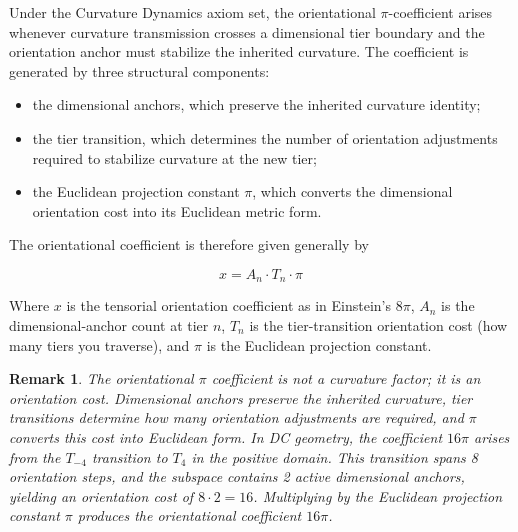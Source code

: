 \documentclass[final,onefignum,onetabnum]{siamart}
\newtheorem{remark}{Remark}
\begin{document}
\begin{theorem}
Under the Curvature Dynamics axiom set, the orientational $\pi$-coefficient arises whenever curvature transmission crosses a dimensional tier boundary and the orientation anchor must stabilize the inherited curvature. The coefficient is generated by three structural components:

\begin{itemize}
    \item the dimensional anchors, which preserve the inherited curvature identity;
    \item the tier transition, which determines the number of orientation adjustments required to stabilize curvature at the new tier;
    \item the Euclidean projection constant $\pi$, which converts the dimensional orientation cost into its Euclidean metric form.
\end{itemize}

The orientational coefficient is therefore given generally by


\[
x = A_n \cdot T_n \cdot \pi
\]


Where $x$ is the tensorial orientation coefficient as in Einstein’s $8\pi$, $A_n$ is the dimensional-anchor count at tier 
$n$, $T_n$ is the tier-transition orientation cost (how many tiers you traverse), and $\pi$ is the Euclidean projection constant.
\begin{remark}
The orientational $\pi$ coefficient is not a curvature factor; it is an orientation cost. Dimensional anchors preserve the inherited curvature, tier transitions determine how many orientation adjustments are required, and $\pi$ converts this cost into Euclidean form. In DC geometry, the coefficient $16\pi$ arises from the $T_{-4}$ transition to $T_4$ in the positive domain. This transition spans 8 orientation steps, and the subspace contains 2 active dimensional anchors, yielding an orientation cost of $8 \cdot 2=16$. Multiplying by the Euclidean projection constant $\pi$ produces the orientational coefficient $16\pi$.
\end{remark}
\end{theorem}
\end{document}
